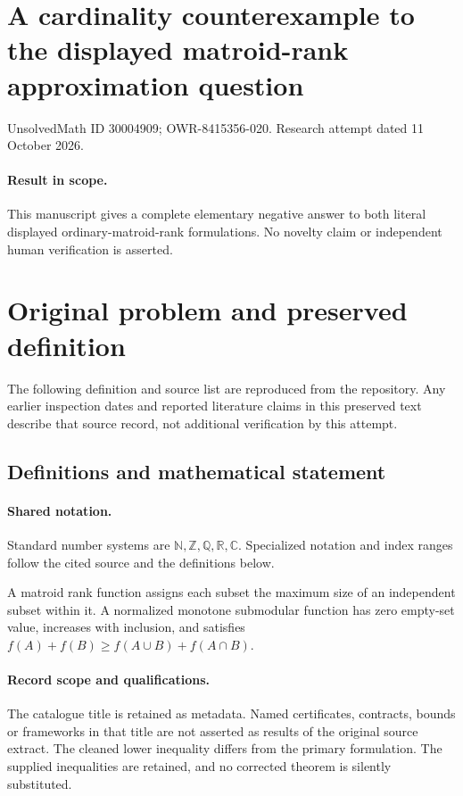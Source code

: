 \documentclass[11pt]{article}
\begin{document}
\section*{A cardinality counterexample to the displayed matroid-rank approximation question}
\noindent UnsolvedMath ID 30004909; OWR-8415356-020. Research attempt dated 11 October 2026.
\paragraph{Result in scope.}This manuscript gives a complete elementary negative answer to both literal displayed ordinary-matroid-rank formulations. No novelty claim or independent human verification is asserted.
\section{Original problem and preserved definition}
The following definition and source list are reproduced from the repository. Any earlier inspection dates and reported literature claims in this preserved text describe that source record, not additional verification by this attempt.
\subsection{Definitions and mathematical statement}

\paragraph{Shared notation.}Standard number systems are $\mathbb N,\mathbb Z,\mathbb Q,\mathbb R,\mathbb C$. Specialized notation and index ranges follow the cited source and the definitions below.


A matroid rank function assigns each subset the maximum size of an independent subset within it. A normalized monotone submodular function has zero empty-set value, increases with inclusion, and satisfies $f(A)+f(B)\geq f(A\cup B)+f(A\cap B)$.
\paragraph{Record scope and qualifications.}
The catalogue title is retained as metadata. Named certificates, contracts, bounds or frameworks in that title are not asserted as results of the original source extract.
The cleaned lower inequality differs from the primary formulation. The supplied inequalities are retained, and no corrected theorem is silently substituted.
\end{document}
